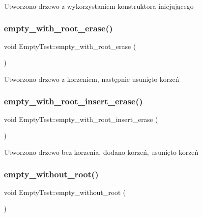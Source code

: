 Utworzono drzewo z wykorzystaniem konstruktora inicjującego \mbox{\label{class_empty_test_a5112f76f08ce5f0b52016ea8a8afff4b}} 
\subsubsection{\texorpdfstring{empty\+\_\+with\+\_\+root\+\_\+erase()}{empty\_with\_root\_erase()}}
{\footnotesize\ttfamily void Empty\+Test\+::empty\+\_\+with\+\_\+root\+\_\+erase (\begin{DoxyParamCaption}{ }\end{DoxyParamCaption})\hspace{0.3cm}{\ttfamily [inline]}}

Utworzono drzewo z korzeniem, następnie usunięto korzeń \mbox{\label{class_empty_test_a6a62d370484dd86a856514d168d176d4}} 
\subsubsection{\texorpdfstring{empty\+\_\+with\+\_\+root\+\_\+insert\+\_\+erase()}{empty\_with\_root\_insert\_erase()}}
{\footnotesize\ttfamily void Empty\+Test\+::empty\+\_\+with\+\_\+root\+\_\+insert\+\_\+erase (\begin{DoxyParamCaption}{ }\end{DoxyParamCaption})\hspace{0.3cm}{\ttfamily [inline]}}

Utworzono drzewo bez korzenia, dodano korzeń, usunięto korzeń \mbox{\label{class_empty_test_a27a72313c820dae24223b04c4f1cc376}} 
\subsubsection{\texorpdfstring{empty\+\_\+without\+\_\+root()}{empty\_without\_root()}}
{\footnotesize\ttfamily void Empty\+Test\+::empty\+\_\+without\+\_\+root (\begin{DoxyParamCaption}{ }\end{DoxyParamCaption})\hspace{0.3cm}{\ttfamily [inline]}}

